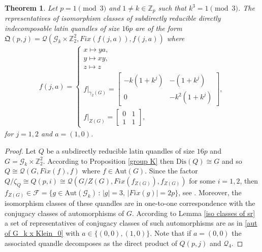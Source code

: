 \documentclass[a4paper, english, 9pt]{amsart}
\theoremstyle{plain}
\newtheorem{theorem}{Theorem}[section]
\newtheorem{proposition}[theorem]{Proposition}
\theoremstyle{definition}
\def\aut#1{\mathrm{Aut}(#1)}
\def\lmlt{\mathrm{LMlt}}
\def\dis{\mathrm{Dis}}
\def\setof#1#2{\{#1\,\colon\,#2\}}
\def\Z{\mathbb Z}
\begin{document}
\begin{theorem}\label{sr quandles}
Let $p=1\pmod{3}$ and $1\neq k\in \Z_p$ such that $k^3=1\pmod{3}$. The representatives of isomorphism classes of subdirectly reducible directly indecomposable latin quandles of size $16p$ are of the form $\mathfrak{Q}(p,j)=\mathcal{Q}(\mathcal{G}_k\times \Z_2^2,Fix(f(j,a)),f(j,a))$ where
   \begin{align}\label{aut of G_k x Klein_0}
        f(j,a)=\begin{cases}
          x\mapsto y a,\\
                  y\mapsto xy ,\\
                  z\mapsto z\\   f|_{\gamma_2(G)}=\begin{bmatrix}
                      -k(1+k^j) & -(1+k^j)\\
                      0 & -k^2(1+k^j)
                  \end{bmatrix},
                  \\
                  f|_{Z(G)}=\begin{bmatrix}
                      0 & 1\\
                      1 & 1
                  \end{bmatrix},
        \end{cases}
    \end{align}
   for $j=1,2$ and $a=(1,0)$.
\end{theorem}

\begin{proof}
Let $Q$ be a subdirectly reducible latin quandles of size $16p$ and $G=\mathcal{G}_k\times \Z_2^2$. According to Proposition \ref{group K} then $\dis(Q)\cong G$ and so $Q\cong \mathcal{Q}(G,Fix(f),f)$ where $f\in \aut{G}$. Since the factor $Q/\zeta_Q\cong Q(p,i)\cong \mathcal{Q}(G/Z(G),Fix(f_{Z(G)}), f_{Z(G)})$ for some $i=1,2$, then $f_{Z(G)}\in \mathcal{F}=\setof{g\in \aut{\mathcal{G}_k}}{|g|=3,\, |Fix(g)|=2p}$, see \cite{LSS}.
Moreover, the isomorphism classes of these quandles are in one-to-one correspondence with the conjugacy classes of automorphisms of $G$. According to Lemma \ref{iso classes of sr} a set of representatives of conjugacy classes of such automorphisms are as in \eqref{aut of G_k x Klein_0} with $a\in \{(0,0),(1,0)\}$. Note that if $a=(0,0)$ the associated quandle decomposes as the direct product of $Q(p,j)$ and $\mathcal{Q}_4$.
\end{proof}

       
\end{document}

